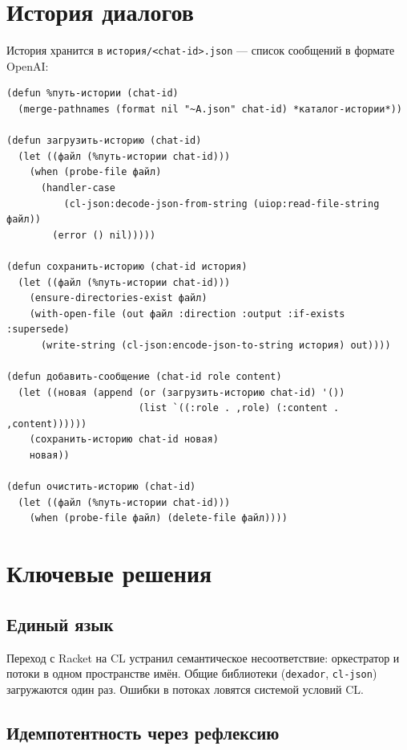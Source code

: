 \documentclass[11pt,a4paper]{article}
\begin{document}
\section{История диалогов}

История хранится в \texttt{история/<chat-id>.json} — список сообщений в формате OpenAI:

\begin{lstlisting}[caption={мастер/cl/история.lisp}]
(defun %путь-истории (chat-id)
  (merge-pathnames (format nil "~A.json" chat-id) *каталог-истории*))

(defun загрузить-историю (chat-id)
  (let ((файл (%путь-истории chat-id)))
    (when (probe-file файл)
      (handler-case
          (cl-json:decode-json-from-string (uiop:read-file-string файл))
        (error () nil)))))

(defun сохранить-историю (chat-id история)
  (let ((файл (%путь-истории chat-id)))
    (ensure-directories-exist файл)
    (with-open-file (out файл :direction :output :if-exists :supersede)
      (write-string (cl-json:encode-json-to-string история) out))))

(defun добавить-сообщение (chat-id role content)
  (let ((новая (append (or (загрузить-историю chat-id) '())
                       (list `((:role . ,role) (:content . ,content))))))
    (сохранить-историю chat-id новая)
    новая))

(defun очистить-историю (chat-id)
  (let ((файл (%путь-истории chat-id)))
    (when (probe-file файл) (delete-file файл))))
\end{lstlisting}

\section{Ключевые решения}

\subsection{Единый язык}

Переход с Racket на CL устранил семантическое несоответствие: оркестратор и потоки в одном пространстве имён. Общие библиотеки (\texttt{dexador}, \texttt{cl-json}) загружаются один раз. Ошибки в потоках ловятся системой условий CL.

\subsection{Идемпотентность через рефлексию}
\end{document}
